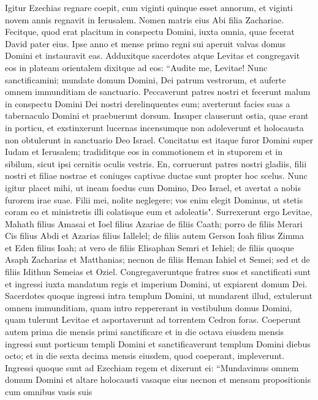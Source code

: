 \begin{biblechapter}  
\verse Igitur Ezechias regnare coepit, cum viginti quinque esset annorum, et viginti novem annis regnavit in Ierusalem. Nomen matris eius Abi filia Zachariae. 
\verse Fecitque, quod erat placitum in conspectu Domini, iuxta omnia, quae fecerat David pater eius. 
\verse Ipse anno et mense primo regni sui aperuit valvas domus Domini et instauravit eas. 
\verse Adduxitque sacerdotes atque Levitas et congregavit eos in plateam orientalem 
\verse dixitque ad eos: “Audite me, Levitae! Nunc sanctificamini; mundate domum Domini, Dei patrum vestrorum, et auferte omnem immunditiam de sanctuario. 
\verse Peccaverunt patres nostri et fecerunt malum in conspectu Domini Dei nostri derelinquentes eum; averterunt facies suas a tabernaculo Domini et praebuerunt dorsum. 
\verse Insuper clauserunt ostia, quae erant in porticu, et exstinxerunt lucernas incensumque non adoleverunt et holocausta non obtulerunt in sanctuario Deo Israel. 
\verse Concitatus est itaque furor Domini super Iudam et Ierusalem; tradiditque eos in commotionem et in stuporem et in sibilum, sicut ipsi cernitis oculis vestris. 
\verse En, corruerunt patres nostri gladiis, filii nostri et filiae nostrae et coniuges captivae ductae sunt propter hoc scelus. 
\verse Nunc igitur placet mihi, ut ineam foedus cum Domino, Deo Israel, et avertat a nobis furorem irae suae. 
\verse Filii mei, nolite neglegere; vos enim elegit Dominus, ut stetis coram eo et ministretis illi colatisque eum et adoleatis". 
\verse Surrexerunt ergo Levitae, Mahath filius Amasai et Ioel filius Azariae de filiis Caath; porro de filiis Merari Cis filius Abdi et Azarias filius Iallelel; de filiis autem Gerson Ioah filius Zimma et Eden filius Ioah; 
\verse at vero de filiis Elisaphan Semri et Iehiel; de filiis quoque Asaph Zacharias et Matthanias; 
\verse necnon de filiis Heman Iahiel et Semei; sed et de filiis Idithun Semeias et Oziel. 
\verse Congregaveruntque fratres suos et sanctificati sunt et ingressi iuxta mandatum regis et imperium Domini, ut expiarent domum Dei. 
\verse Sacerdotes quoque ingressi intra templum Domini, ut mundarent illud, extulerunt omnem immunditiam, quam intro reppererant in vestibulum domus Domini, quam tulerunt Levitae et asportaverunt ad torrentem Cedron foras. 
\verse Coeperunt autem prima die mensis primi sanctificare et in die octava eiusdem mensis ingressi sunt porticum templi Domini et sanctificaverunt templum Domini diebus octo; et in die sexta decima mensis eiusdem, quod coeperant, impleverunt.  
\verse Ingressi quoque sunt ad Ezechiam regem et dixerunt ei: “Mundavimus omnem domum Domini et altare holocausti vasaque eius necnon et mensam propositionis cum omnibus vasis suis 

\end{biblechapter}
